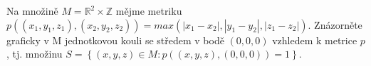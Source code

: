 Na množině $M=\mathbb{R}^{2}\times \mathbb{Z}$ mějme metriku
$p((x_{1},y_{1},z_{1}), (x_{2},y_{2},z_{2}))=max(|x_{1}-x_{2}|, |y_{1}-y_{2}|,
|z_{1}-z_{2}|)$. Znázorněte graficky v M jednotkovou kouli se středem v bodě
$(0,0,0)$ vzhledem k metrice $p$, tj. množinu $S=\left \{ (x,y,z) \in M
:p((x,y,z),(0,0,0))=1\right \}$.
